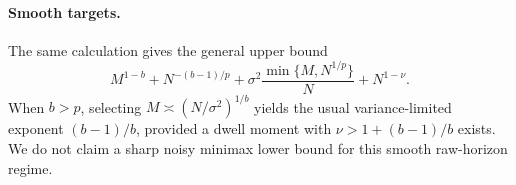\paragraph{Smooth targets.}
The same calculation gives the general upper bound
\[
M^{1-b}+N^{-(b-1)/p}
+\sigma^2\frac{\min\{M,N^{1/p}\}}{N}+N^{1-\nu}.
\]
When $b>p$, selecting $M\asymp(N/\sigma^2)^{1/b}$ yields the usual
variance-limited exponent $(b-1)/b$, provided a dwell moment with
$\nu>1+(b-1)/b$ exists. We do not claim a sharp noisy minimax lower bound for
this smooth raw-horizon regime.
